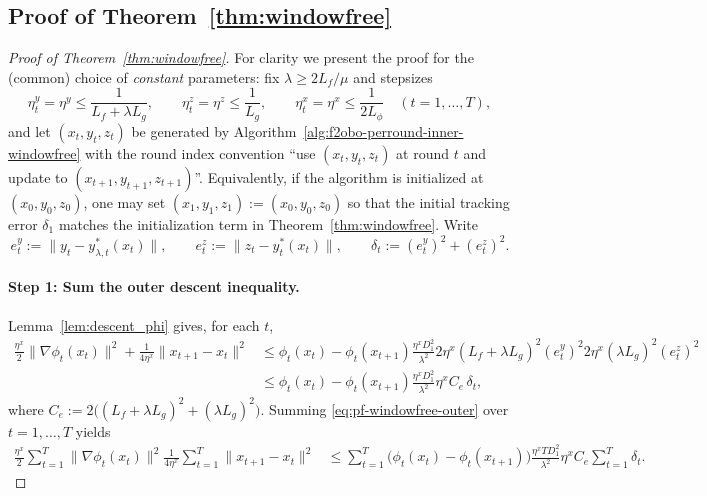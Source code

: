 \documentclass{uai2026} %
\begin{document}
\subsection{Proof of Theorem~\ref{thm:windowfree}}\label{sec:proof-windowfree}
\begin{proof}[Proof of Theorem~\ref{thm:windowfree}]
For clarity we present the proof for the (common) choice of \emph{constant} parameters:
fix $\lambda\ge 2L_f/\mu$ and stepsizes
\[
\eta_t^y=\eta^y\le \frac{1}{L_f+\lambda L_g},\qquad
\eta_t^z=\eta^z\le \frac{1}{L_g},\qquad
\eta_t^x=\eta^x\le \frac{1}{2L_\phi}\quad (t=1,\ldots,T),
\]
and let $(x_t,y_t,z_t)$ be generated by Algorithm~\ref{alg:f2obo-perround-inner-windowfree} with the round index convention
``use $(x_t,y_t,z_t)$ at round $t$ and update to $(x_{t+1},y_{t+1},z_{t+1})$''.
Equivalently, if the algorithm is initialized at $(x_0,y_0,z_0)$, one may set $(x_1,y_1,z_1):=(x_0,y_0,z_0)$ so that the
initial tracking error $\delta_1$ matches the initialization term in Theorem~\ref{thm:windowfree}.
Write
\[
e_t^y:=\|y_t-y^{*}_{\lambda,t}(x_t)\|,\qquad e_t^z:=\|z_t-y_t^{*}(x_t)\|,\qquad \delta_t:=(e_t^y)^2+(e_t^z)^2.
\]

\paragraph{Step 1: Sum the outer descent inequality.}
Lemma~\ref{lem:descent_phi} gives, for each $t$,
\begin{align}
\frac{\eta^x}{2}\|\nabla\phi_t(x_t)\|^2+\frac{1}{4\eta^x}\|x_{t+1}-x_t\|^2
&\le \phi_t(x_t)-\phi_t(x_{t+1})
\frac{\eta^xD_1^2}{\lambda^2}
2\eta^x(L_f+\lambda L_g)^2(e_t^y)^2
2\eta^x(\lambda L_g)^2(e_t^z)^2\nonumber\\
&\le \phi_t(x_t)-\phi_t(x_{t+1})
\frac{\eta^xD_1^2}{\lambda^2}
\eta^x C_e\,\delta_t,
\label{eq:pf-windowfree-outer}
\end{align}
where $C_e:=2\big((L_f+\lambda L_g)^2+(\lambda L_g)^2\big)$.
Summing \eqref{eq:pf-windowfree-outer} over $t=1,\ldots,T$ yields
\begin{align}
\frac{\eta^x}{2}\sum_{t=1}^T\|\nabla\phi_t(x_t)\|^2
\frac{1}{4\eta^x}\sum_{t=1}^T\|x_{t+1}-x_t\|^2
&\le \sum_{t=1}^T\big(\phi_t(x_t)-\phi_t(x_{t+1})\big)
\frac{\eta^xTD_1^2}{\lambda^2}
\eta^x C_e\sum_{t=1}^T\delta_t.
\label{eq:pf-windowfree-sum1}
\end{align}


\end{proof}
\end{document}
